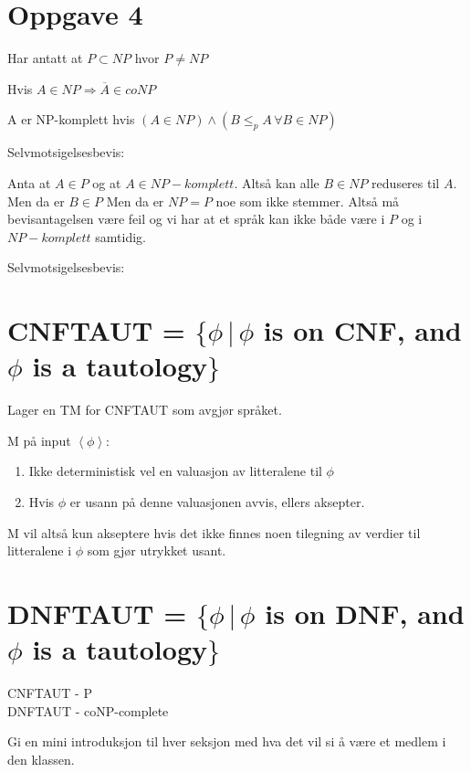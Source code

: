 \documentclass{article}
\begin{document}
\newpage









\section{Oppgave 4}

Har antatt at $P \subset NP$ hvor $P \neq NP$

Hvis $A \in NP \Rightarrow \overline{A} \in coNP$

A er NP-komplett hvis $(A \in NP) \land (B \leq_p A \, \forall B \in NP)$


Selvmotsigelsesbevis:

Anta at $A \in P$ og at $A \in NP-komplett$. Altså kan alle $B \in NP$ reduseres til $A$. Men da er $B \in P$ Men da er $NP = P$ noe som ikke stemmer. Altså må bevisantagelsen være feil og vi har at et språk kan ikke både være i $P $ og i $NP-komplett$ samtidig.


Selvmotsigelsesbevis:




















\newpage



\section{CNFTAUT = $\{\phi \, |  \, \phi $ is on CNF, and $\phi$ is a tautology$\}$}

Lager en TM for CNFTAUT som avgjør språket.

M på input $\left<\phi\right>$:
\begin{enumerate}
\item Ikke deterministisk vel en valuasjon av litteralene til $\phi$
\item Hvis $\phi$ er usann på denne valuasjonen avvis, ellers aksepter.
\end{enumerate}

M vil altså kun akseptere hvis det ikke finnes noen tilegning av verdier til litteralene i $\phi$ som gjør utrykket usant.



\section{DNFTAUT = $\{\phi \, |  \, \phi $ is on DNF, and $\phi$ is a tautology$\}$}





CNFTAUT  - P \\
DNFTAUT  - coNP-complete


Gi en mini introduksjon til hver seksjon med hva det vil si å være et medlem i den klassen. 
\end{document}
